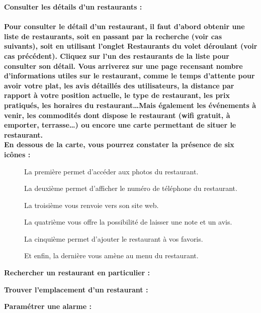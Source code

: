 \begin{description}
    \item \bf{Consulter les détails d'un restaurants :} \\ \\
        Pour consulter le détail d'un restaurant, il faut d'abord obtenir une liste de restaurants, soit en passant par la recherche (voir cas suivants), soit en utilisant l'onglet \og{}Restaurants\fg{} du volet déroulant (voir cas précédent). Cliquez sur l'un des restaurants de la liste pour consulter son détail. Vous arriverez sur une page recensant nombre d'informations utiles sur le restaurant, comme le temps d’attente pour avoir votre plat, les avis détaillés des utilisateurs, la distance par rapport à votre position actuelle, le type de restaurant, les prix pratiqués, les horaires du restaurant\dots Mais également les événements à venir, les commodités dont dispose le restaurant (wifi gratuit, à emporter, terrasse\dots) ou encore une carte permettant de situer le restaurant. \\
        En dessous de la carte, vous pourrez constater la présence de six icônes : \\
            \begin{description}
                \item[\textbullet] La première permet d’accéder aux photos du restaurant. 
                \item[\textbullet] La deuxième permet d’afficher le numéro de téléphone du restaurant.
                \item[\textbullet] La troisième vous renvoie vers son site web. 
                \item[\textbullet] La quatrième vous offre la possibilité de laisser une note et un avis. 
                \item[\textbullet] La cinquième permet d’ajouter le restaurant à vos favoris. 
                \item[\textbullet] Et enfin, la dernière vous amène au menu du restaurant. \\
            \end{description}

    \item \bf{Rechercher un restaurant en particulier :}
        \begin{description}
             \item
        \end{description}
    \item \bf{Trouver l'emplacement d'un restaurant :}
        \begin{description}
             \item
        \end{description}
    \item \bf{Paramétrer une alarme :}
        \begin{description}
             \item
        \end{description}
\end{description}

